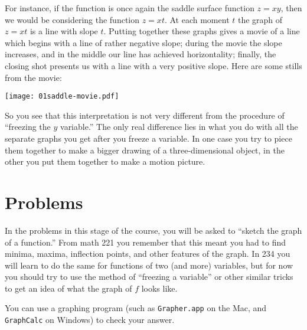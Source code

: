 For instance, if the function is once again the saddle surface
function $z=xy$, then we would be considering the function $z=xt$. At
each moment $t$ the graph of $z=xt$ is a line with slope $t$. Putting
together these graphs gives a movie of a line which begins with a line
of rather negative slope;  during the movie the slope increases,
and in the middle our line has achieved horizontality;  finally, the
closing shot presents us with a line with a very positive slope.
Here are some stills from the movie:

\begin{center}
  \texttt{[image: 01saddle-movie.pdf]}
\end{center}

So you see that this interpretation is not very different from the
procedure of ``freezing the $y$ variable.'' The only real difference
lies in what you do with all the separate graphs you get after you
freeze a variable. In one case you try to piece them together to make a
bigger drawing of a three-dimensional object, in the other you put them
together to make a motion picture.



\section*{Problems} %

\problemfont

In the problems in this stage of the course, you will be asked to
``sketch the graph of a function.''  From math 221 you remember that
this meant you had to find minima, maxima, inflection points, and other
features of the graph.  In 234 you will learn to do the same for
functions of two (and more) variables, but for now you should try to
use the method of ``freezing a variable'' or other similar tricks to
get an idea of what the graph of $f$ looks like.

You can use a graphing program (such as \texttt{Grapher.app} on the
Mac, and \texttt{GraphCalc} on Windows) to check your answer.

\begin{center}
\end{center}

